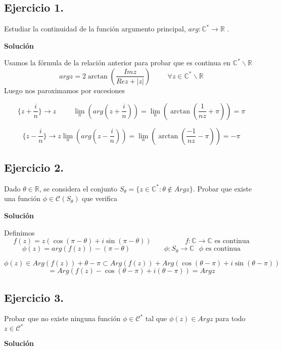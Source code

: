 \subsection{Ejercicio 1.}
Estudiar la continuidad de la función argumento principal, $arg : \mathbb{C}^{\ast} \rightarrow \mathbb{R}$ .

\textbf{Solución}

Usamos la fórmula de la relación anterior para probar que es continua en $\mathbb{C}^{\ast} \backslash \mathbb{R}$
$$  
arg z = 2\arctan (\frac{Imz}{Rez + |z|}) \hspace{1cm} \forall z\in\mathbb{C}^{\ast}\backslash\mathbb{R}
$$
Luego nos paroximamos por sucesiones

$$  
\{ z+\frac{i}{n} \} \rightarrow z \hspace{1cm}
\lim_n(arg(z+\frac{i}{n})) = \lim_n( \arctan(\frac{1}{nz}+\pi) ) = \pi
$$

$$
\{ z-\frac{i}{n} \} \rightarrow z
\lim_n(arg(z-\frac{i}{n})) = \lim_n( \arctan(\frac{-1}{nz}-\pi) ) = -\pi
$$


\subsection{Ejercicio 2.}
Dado $\theta\in\mathbb{R}$, se considera el conjunto $S_{\theta} = \{ z\in\mathbb{C}^{\ast} : \theta\not\in Argz \}$. 
Probar que existe una función $\phi\in\mathcal{C}(S_{\theta})$ que verifica


\textbf{Solución}

Definimos
$$
f(z) = z( \cos(\pi-\theta) + i\sin(\pi-\theta) ) \hspace{2cm} f:\mathbb{C}\rightarrow \mathbb{C} \text{ es continua}
$$
$$
\phi(z) = arg(f(z)) - (\pi-\theta) \hspace{2cm} \phi: S_{\theta} \rightarrow \mathbb{C} \text{ $\phi$ es continua}
$$

$$ 
\phi(z) \in Arg (f(z)) + \theta-\pi \subset Arg (f(z)) + Arg( \cos(\theta-\pi)+i\sin(\theta-\pi) ) 
$$
$$= Arg ( f(z)-\cos(\theta-\pi)+i(\theta-\pi) ) = Argz
$$


\subsection{Ejercicio 3.}
Probar que no existe ninguna función $\phi\in\mathcal{C}^{\ast}$ tal que $\phi(z)\in Argz$ para todo $z\in\mathcal{C}^{\ast}$



\textbf{Solución}

